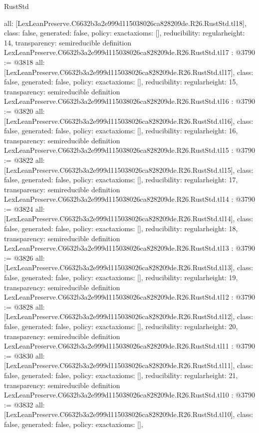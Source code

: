 \begin{lexlean}{RustStd}
\begin{coremodule}
{  all: [LexLeanPreserve.C6632b3a2e999d115038026ca828209de.R26.RustStd.tl18],
  class: false,
  generated: false,
  policy: exact{axioms: []},
  reducibility: regular{height: 14},
  transparency: semireducible
}
definition LexLeanPreserve.C6632b3a2e999d115038026ca828209de.R26.RustStd.tl17 : @3790 := @3818 {
  all: [LexLeanPreserve.C6632b3a2e999d115038026ca828209de.R26.RustStd.tl17],
  class: false,
  generated: false,
  policy: exact{axioms: []},
  reducibility: regular{height: 15},
  transparency: semireducible
}
definition LexLeanPreserve.C6632b3a2e999d115038026ca828209de.R26.RustStd.tl16 : @3790 := @3820 {
  all: [LexLeanPreserve.C6632b3a2e999d115038026ca828209de.R26.RustStd.tl16],
  class: false,
  generated: false,
  policy: exact{axioms: []},
  reducibility: regular{height: 16},
  transparency: semireducible
}
definition LexLeanPreserve.C6632b3a2e999d115038026ca828209de.R26.RustStd.tl15 : @3790 := @3822 {
  all: [LexLeanPreserve.C6632b3a2e999d115038026ca828209de.R26.RustStd.tl15],
  class: false,
  generated: false,
  policy: exact{axioms: []},
  reducibility: regular{height: 17},
  transparency: semireducible
}
definition LexLeanPreserve.C6632b3a2e999d115038026ca828209de.R26.RustStd.tl14 : @3790 := @3824 {
  all: [LexLeanPreserve.C6632b3a2e999d115038026ca828209de.R26.RustStd.tl14],
  class: false,
  generated: false,
  policy: exact{axioms: []},
  reducibility: regular{height: 18},
  transparency: semireducible
}
definition LexLeanPreserve.C6632b3a2e999d115038026ca828209de.R26.RustStd.tl13 : @3790 := @3826 {
  all: [LexLeanPreserve.C6632b3a2e999d115038026ca828209de.R26.RustStd.tl13],
  class: false,
  generated: false,
  policy: exact{axioms: []},
  reducibility: regular{height: 19},
  transparency: semireducible
}
definition LexLeanPreserve.C6632b3a2e999d115038026ca828209de.R26.RustStd.tl12 : @3790 := @3828 {
  all: [LexLeanPreserve.C6632b3a2e999d115038026ca828209de.R26.RustStd.tl12],
  class: false,
  generated: false,
  policy: exact{axioms: []},
  reducibility: regular{height: 20},
  transparency: semireducible
}
definition LexLeanPreserve.C6632b3a2e999d115038026ca828209de.R26.RustStd.tl11 : @3790 := @3830 {
  all: [LexLeanPreserve.C6632b3a2e999d115038026ca828209de.R26.RustStd.tl11],
  class: false,
  generated: false,
  policy: exact{axioms: []},
  reducibility: regular{height: 21},
  transparency: semireducible
}
definition LexLeanPreserve.C6632b3a2e999d115038026ca828209de.R26.RustStd.tl10 : @3790 := @3832 {
  all: [LexLeanPreserve.C6632b3a2e999d115038026ca828209de.R26.RustStd.tl10],
  class: false,
  generated: false,
  policy: exact{axioms: []},
}
\end{coremodule}
\end{lexlean}
